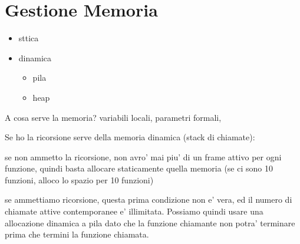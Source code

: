 % 

\chapter{Gestione Memoria}
\begin{itemize}
\item sttica
\item dinamica
  \begin{itemize}
  \item pila
  \item heap
  \end{itemize}
\end{itemize}

A cosa serve la memoria? variabili locali, parametri formali, 

Se ho la ricorsione serve della memoria dinamica (stack di chiamate):

se non ammetto la ricorsione, non avro' mai piu' di un frame attivo per ogni funzione, quindi basta allocare staticamente quella memoria (se ci sono 10 funzioni, alloco lo spazio per 10 funzioni)

se ammettiamo ricorsione, questa prima condizione non e' vera, ed il numero di chiamate attive contemporanee e' illimitata. Possiamo quindi usare una allocazione dinamica a pila dato che la funzione chiamante non potra' terminare prima che termini la funzione chiamata.

% 
